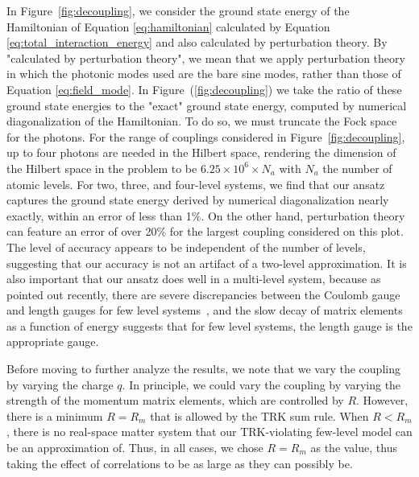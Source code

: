 \documentclass[aps,prb,twocolumn,
	groupedaddress,superscriptaddress,
	amsfonts,amssymb,amsmath,floatfix,
	citeautoscript]{revtex4-1}
\begin{document}
In Figure~\ref{fig:decoupling}, we consider the ground state energy of the Hamiltonian of Equation \ref{eq:hamiltonian}  calculated by Equation \ref{eq:total_interaction_energy} and also calculated by perturbation theory. By "calculated by perturbation theory", we mean that we apply perturbation theory in which the photonic modes used are the bare sine modes, rather than those of Equation \ref{eq:field_mode}.  In Figure~(\ref{fig:decoupling}) we take the ratio of these ground state energies to the "exact" ground state energy, computed by numerical diagonalization of the Hamiltonian. To do so, we must truncate the Fock space for the photons. For the range of couplings considered in Figure~\ref{fig:decoupling}, up to four photons are needed in the Hilbert space, rendering the dimension of the Hilbert space in the problem to be $6.25\times10^6 \times N_a$ with $N_a$ the number of atomic levels. For two, three, and four-level systems, we find that our ansatz captures the ground state energy derived by numerical diagonalization nearly exactly, within an error of less than 1\%. On the other hand, perturbation theory can feature an error of over 20\% for the largest coupling considered on this plot. The level of accuracy appears to be independent of the number of levels, suggesting that our accuracy is not an artifact of a two-level approximation. It is also important that our ansatz does well in a multi-level system, because as pointed out recently, there are severe discrepancies between the Coulomb gauge and length gauges for few level systems~\cite{schaefer2018, bernardis2018}, and the slow decay of matrix elements as a function of energy suggests that for few level systems, the length gauge is the appropriate gauge.

Before moving to further analyze the results, we note that we vary the coupling by varying the charge $q$. In principle, we could vary the coupling by varying the strength of the momentum matrix elements, which are controlled by $R$. However, there is a minimum $R=R_{m}$ that is allowed by the TRK sum rule. When $R < R_m$, there is no real-space matter system that our TRK-violating  few-level model can be an approximation of. Thus, in all cases, we chose $R=R_m$ as the value, thus taking the effect of correlations to be as large as they can possibly be.
\end{document}
